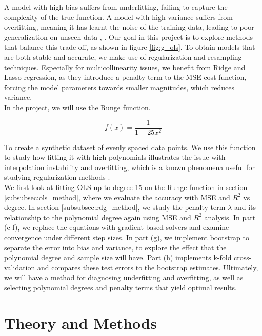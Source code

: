 \documentclass[amssymb,twocolumn,aps]{revtex4-2}
\begin{document}
A model with high bias suffers from underfitting, failing to capture the complexity of the true function. A model with high variance suffers from overfitting, meaning it has learnt the noise of the training data, leading to poor generalization on unseen data \cite{compfys38}, \cite{hastie}. Our goal in this project is to explore methods that balance this trade-off, as shown in figure \ref{fig:g_ols}. To obtain models that are both stable and accurate, we make use of regularization and resampling techniques. Especially for multicollinearity issues, we benefit from Ridge and Lasso regression, as they introduce a penalty term to the MSE cost function, forcing the model parameters towards smaller magnitudes, which reduces variance. \\

In the project, we will use the Runge function.

\begin{equation}
    f(x) = \frac{1}{1 + 25x^2}
    \label{eq:runge}
\end{equation}


To create a synthetic dataset of evenly spaced data points. We use this function to study how fitting it with high-polynomials illustrates the issue with interpolation instability and overfitting, which is a known phenomena useful for studying regularization methods \cite{wikipedia-runge}. \\

We first look at fitting OLS up to degree 15 on the Runge function in section \ref{subsubsec:ols_method}, where we evaluate the accuracy with MSE and $R^2$ vs degree. In section \ref{subsubsec:rdg_method}, we study the penalty term $\lambda$ and its relationship to the polynomial degree again using MSE and $R^2$ analysis. In part (c-f), we replace the equations with gradient-based solvers and examine convergence under different step sizes. In part (g), we implement bootstrap to separate the error into bias and variance, to explore the effect that the polynomial degree and sample size will have. Part (h) implements k-fold cross-validation and compares these test errors to the bootstrap estimates. Ultimately, we will have a method for diagnosing underfitting and overfitting, as well as selecting polynomial degrees and penalty terms that yield optimal results. 

\section{Theory and Methods}
\end{document}
